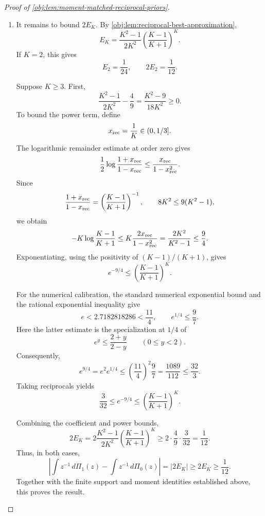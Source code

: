 \begin{proof}[Proof of \cref{obj:lem:moment-matched-reciprocal-priors}]
\begin{enumerate}
For the reciprocal function, the orientation gives
\[
\int z^{-1}\,d\Pi_1(z)-\int z^{-1}\,d\Pi_0(z)
=
\begin{cases}
2d_\star,&d_\star\ge0,\\
-2d_\star,&d_\star<0
\end{cases}
=2|d_\star|=2E_K.
\]

\item It remains to bound \(2E_K\). By \cref{obj:lem:reciprocal-best-approximation},
\[
E_K=\frac{K^2-1}{2K^2}
\left(\frac{K-1}{K+1}\right)^K.
\]
If \(K=2\), this gives
\[
E_2=\frac1{24},
\qquad
2E_2=\frac1{12}.
\]

Suppose \(K\ge3\). First,
\[
\frac{K^2-1}{2K^2}-\frac49
=\frac{K^2-9}{18K^2}\ge0.
\]
To bound the power term, define
\[
x_{\rm rec}=\frac1K\in(0,1/3].
\]
The logarithmic remainder estimate at order zero gives
\[
\frac12\log\frac{1+x_{\rm rec}}{1-x_{\rm rec}}
\le\frac{x_{\rm rec}}{1-x_{\rm rec}^2}.
\]
Since
\[
\frac{1+x_{\rm rec}}{1-x_{\rm rec}}
=\left(\frac{K-1}{K+1}\right)^{-1},
\qquad
8K^2\le9(K^2-1),
\]
we obtain
\[
-K\log\frac{K-1}{K+1}
\le K\frac{2x_{\rm rec}}{1-x_{\rm rec}^2}
=\frac{2K^2}{K^2-1}
\le\frac94.
\]
Exponentiating, using the positivity of \((K-1)/(K+1)\), gives
\[
e^{-9/4}\le\left(\frac{K-1}{K+1}\right)^K.
\]

For the numerical calibration, the standard numerical exponential bound and the rational exponential inequality give
\[
e<2.7182818286<\frac{11}{4},
\qquad
e^{1/4}\le\frac97.
\]
Here the latter estimate is the specialization at \(1/4\) of
\[
e^y\le\frac{2+y}{2-y}\qquad(0\le y<2).
\]
Consequently,
\[
e^{9/4}=e^2e^{1/4}
\le\left(\frac{11}{4}\right)^2\frac97
=\frac{1089}{112}
\le\frac{32}{3}.
\]
Taking reciprocals yields
\[
\frac3{32}\le e^{-9/4}
\le\left(\frac{K-1}{K+1}\right)^K.
\]

Combining the coefficient and power bounds,
\[
2E_K
=2\frac{K^2-1}{2K^2}
 \left(\frac{K-1}{K+1}\right)^K
\ge2\cdot\frac49\cdot\frac3{32}
=\frac1{12}.
\]
Thus, in both cases,
\[
\left|\int z^{-1}\,d\Pi_1(z)-\int z^{-1}\,d\Pi_0(z)\right|
=|2E_K|
\ge2E_K
\ge\frac1{12}.
\]
Together with the finite support and moment identities established above, this proves the result.
\end{enumerate}
\end{proof}

